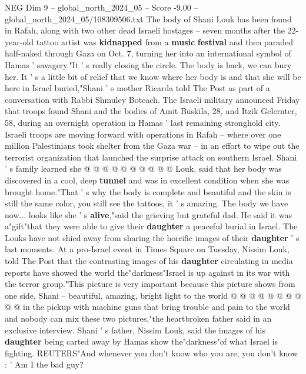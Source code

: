 \begin{textsample}{NEG Dim 9 – global\_north\_2024\_05 – Score -9.00 – global\_north\_2024\_05/108309506.txt}  \label{ex:f9_neg_233}
The body of Shani Louk has been found in Rafah, along with two other dead Israeli hostages -- seven months after the 22-year-old tattoo artist was \textbf{kidnapped} from a \textbf{music} \textbf{festival} and then paraded half-naked through Gaza on Oct. 7, turning her into an international symbol of Hamas ' savagery."It ' s really closing the circle.
The body is back, we can bury her.
It ' s a little bit of relief that we know where her body is and that she will be here in Israel buried,"Shani ' s mother Ricarda told The Post as part of a conversation with Rabbi Shmuley Boteach.
The Israeli military announced Friday that troops found Shani and the bodies of Amit Buskila, 28, and Itzik Gelernter, 58, during an overnight operation in Hamas ' last remaining stronghold city.
Israeli troops are moving forward with operations in Rafah -- where over one million Palestinians took shelter from the Gaza war -- in an effort to wipe out the terrorist organization that launched the surprise attack on southern Israel.
Shani ' s family learned she @ @ @ @ @ @ @ @ @ @ Louk, said that her body was discovered in a cool, deep \textbf{tunnel} and was in excellent condition when she was brought home."That ' s why the body is complete and beautiful and the skin is still the same color, you still see the tattoos, it ' s amazing.
The body we have now... looks like she ' s \textbf{alive},"said the grieving but grateful dad.
He said it was a"gift"that they were able to give their \textbf{daughter} a peaceful burial in Israel.
The Louks have not shied away from sharing the horrific images of their \textbf{daughter} ' s last moments.
At a pro-Israel event in Times Square on Tuesday, Nissim Louk, told The Post that the contrasting images of his \textbf{daughter} circulating in media reports have showed the world the"darkness"Israel is up against in its war with the terror group."This picture is very important because this picture shows from one side, Shani -- beautiful, amazing, bright light to the world @ @ @ @ @ @ @ @ @ @ in the pickup with machine guns that bring trouble and pain to the world and nobody can mix these two pictures,"the heartbroken father said in an exclusive interview.
Shani ' s father, Nissim Louk, said the images of his \textbf{daughter} being carted away by Hamas show the"darkness"of what Israel is fighting.
REUTERS"And whenever you don't know who you are, you don't know : ' Am I the bad guy?

\end{textsample}
